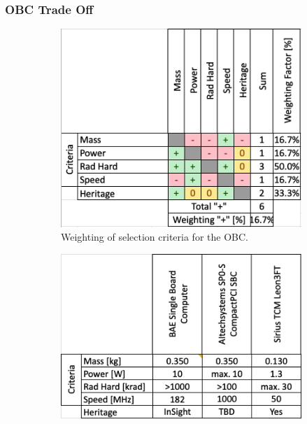 \subsubsection{OBC Trade Off}
\begin{figure}[htb]
     \centering
     \begin{subfigure}[b]{0.49\textwidth}
         \centering
         \includegraphics[width=\textwidth]{Media/Trade_off/OBC/Weighting_OBC.png}
         \caption{Weighting of selection criteria for the OBC.}
         \label{fig:Weighting_Rec}
     \end{subfigure}
     \hfill
     \begin{subfigure}[b]{0.49\textwidth}
         \centering
         \includegraphics[width=\textwidth]{Media/Trade_off/OBC/Values_OBC.png}

\end{subfigure}
\end{figure}
